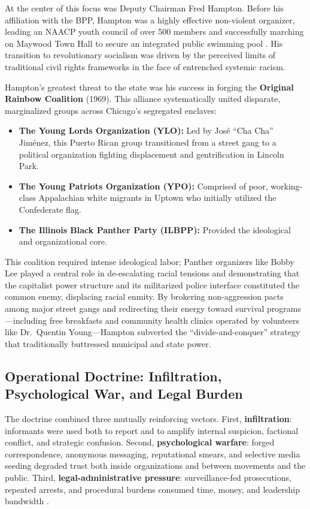 At the center of this focus was Deputy Chairman Fred Hampton. Before his affiliation with the BPP, Hampton was a highly effective non-violent organizer, leading an NAACP youth council of over 500 members and successfully marching on Maywood Town Hall to secure an integrated public swimming pool \cite{hampton_bio}. His transition to revolutionary socialism was driven by the perceived limits of traditional civil rights frameworks in the face of entrenched systemic racism.

Hampton's greatest threat to the state was his success in forging the \textbf{Original Rainbow Coalition} (1969). This alliance systematically united disparate, marginalized groups across Chicago's segregated enclaves:
\begin{itemize}
    \item \textbf{The Young Lords Organization (YLO):} Led by Jos\'{e} ``Cha Cha'' Jim\'{e}nez, this Puerto Rican group transitioned from a street gang to a political organization fighting displacement and gentrification in Lincoln Park.
    \item \textbf{The Young Patriots Organization (YPO):} Comprised of poor, working-class Appalachian white migrants in Uptown who initially utilized the Confederate flag.
    \item \textbf{The Illinois Black Panther Party (ILBPP):} Provided the ideological and organizational core.
\end{itemize}
This coalition required intense ideological labor; Panther organizers like Bobby Lee played a central role in de-escalating racial tensions and demonstrating that the capitalist power structure and its militarized police interface constituted the common enemy, displacing racial enmity. By brokering non-aggression pacts among major street gangs and redirecting their energy toward survival programs---including free breakfasts and community health clinics operated by volunteers like Dr.\ Quentin Young---Hampton subverted the ``divide-and-conquer'' strategy that traditionally buttressed municipal and state power.

\subsection{Operational Doctrine: Infiltration, Psychological War, and Legal Burden}

The doctrine combined three mutually reinforcing vectors. First, \textbf{infiltration}: informants were used both to report and to amplify internal suspicion, factional conflict, and strategic confusion. Second, \textbf{psychological warfare}: forged correspondence, anonymous messaging, reputational smears, and selective media seeding degraded trust both inside organizations and between movements and the public. Third, \textbf{legal-administrative pressure}: surveillance-fed prosecutions, repeated arrests, and procedural burdens consumed time, money, and leadership bandwidth \cite{church_book2_1976, fbi_cointelpro_vault}.

